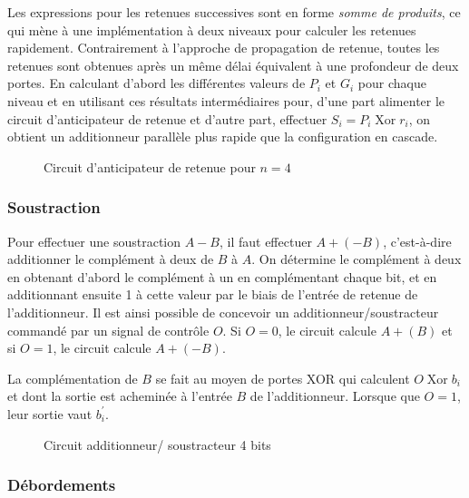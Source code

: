 \documentclass[11pt]{article}
\begin{document}
Les expressions pour les retenues successives sont en forme \emph{somme de
produits}, ce qui mène à une implémentation à deux niveaux pour
calculer les retenues rapidement. Contrairement à l'approche de
propagation de retenue, toutes les retenues sont obtenues après un
même délai équivalent à une profondeur de deux portes.  En calculant
d'abord les différentes valeurs de \(P_i\) et \(G_i\) pour chaque
niveau et en utilisant ces résultats intermédiaires pour, d'une part
alimenter le circuit d'anticipateur de retenue et d'autre part,
effectuer \(S_i = P_i  \operatorname{Xor} r_i\), on obtient un additionneur parallèle
plus rapide que la configuration en cascade.

\begin{figure}[htbp]
\centering

\caption{\label{fig:orgd33a9aa}Circuit d'anticipateur de retenue pour \(n= 4\)}
\end{figure}


\subsubsection{Soustraction}
\label{sec:org509e1ff}

Pour effectuer une soustraction \(A - B\), il faut effectuer \(A +
(-B)\), c’est-à-dire additionner le complément à deux de \(B\) à
\(A\). On détermine le complément à deux en obtenant d'abord le
complément à un en complémentant chaque bit, et en additionnant ensuite
1 à cette valeur par le biais de l'entrée de retenue de l'additionneur. Il
est ainsi possible de concevoir un additionneur/soustracteur commandé
par un signal de contrôle \(O\). Si \(O=0\), le circuit calcule \(A +
(B)\) et si \(O=1\), le circuit calcule \(A + (-B)\).

La complémentation de \(B\) se fait au moyen de portes XOR qui
calculent \(O  \operatorname{Xor} b_i\) et dont la sortie est acheminée à l'entrée
\(B\) de l'additionneur. Lorsque que \(O=1\), leur sortie vaut
\(b_i^\prime\).

\begin{figure}[htbp]
\centering

\caption{\label{fig:orgaddc760}Circuit additionneur/ soustracteur 4 bits}
\end{figure}

\subsubsection{Débordements}
\label{sec:orgecbde65}
\end{document}
